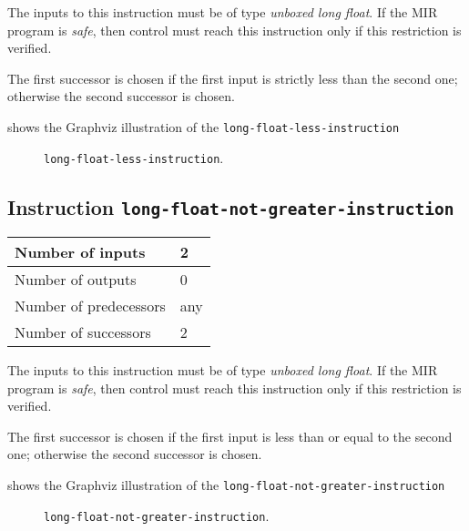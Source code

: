 The inputs to this instruction must be of type \emph{unboxed long
  float}.  If the MIR program is \emph{safe}, then control must reach
this instruction only if this restriction is verified.

The first successor is chosen if the first input is strictly less than
the second one; otherwise the second successor is chosen. 

 shows the Graphviz illustration of the
\texttt{long-float-less-instruction}

\begin{figure}
\begin{center}
\end{center}
\caption{\label{fig-long-float-less-instruction}
\texttt{long-float-less-instruction}.}
\end{figure}

\subsection{Instruction \texttt{long-float-not-greater-instruction}}
\label{mir-instruction-long-float-not-greater}

\begin{tabular}{|l|l|}
\hline
Number of inputs & 2\\
\hline
Number of outputs & 0\\
\hline
Number of predecessors & any\\
\hline
Number of successors & 2\\
\hline
\end{tabular}

The inputs to this instruction must be of type \emph{unboxed long
  float}.  If the MIR program is \emph{safe}, then control must reach
this instruction only if this restriction is verified.

The first successor is chosen if the first input is less than or equal
to the second one; otherwise the second successor is chosen.

 shows the Graphviz illustration of the
\texttt{long-float-not-greater-instruction}

\begin{figure}
\begin{center}
\end{center}
\caption{\label{fig-long-float-not-greater-instruction}
\texttt{long-float-not-greater-instruction}.}
\end{figure}

